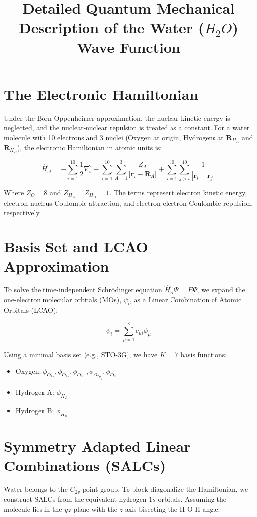 \documentclass[12pt]{article}
\title{Detailed Quantum Mechanical Description of the Water ($H_2O$) Wave Function}
\author{}
\date{}
\begin{document}
\maketitle

\section{The Electronic Hamiltonian}
Under the Born-Oppenheimer approximation, the nuclear kinetic energy is neglected, and the nuclear-nuclear repulsion is treated as a constant. For a water molecule with 10 electrons and 3 nuclei (Oxygen at origin, Hydrogens at $\mathbf{R}_{H_A}$ and $\mathbf{R}_{H_B}$), the electronic Hamiltonian in atomic units is:

\begin{equation}
\hat{H}_{el} = -\sum_{i=1}^{10} \frac{1}{2} \nabla_i^2 - \sum_{i=1}^{10} \sum_{A=1}^{3} \frac{Z_A}{|\mathbf{r}_i - \mathbf{R}_A|} + \sum_{i=1}^{10} \sum_{j>i}^{10} \frac{1}{|\mathbf{r}_i - \mathbf{r}_j|}
\end{equation}

Where $Z_O = 8$ and $Z_{H_A} = Z_{H_B} = 1$. The terms represent electron kinetic energy, electron-nucleus Coulombic attraction, and electron-electron Coulombic repulsion, respectively.

\section{Basis Set and LCAO Approximation}
To solve the time-independent Schr\"{o}dinger equation $\hat{H}_{el} \Psi = E \Psi$, we expand the one-electron molecular orbitals (MOs), $\psi_i$, as a Linear Combination of Atomic Orbitals (LCAO):

\begin{equation}
\psi_i = \sum_{\mu=1}^K c_{\mu i} \phi_\mu
\end{equation}

Using a minimal basis set (e.g., STO-3G), we have $K=7$ basis functions:
\begin{itemize}
    \item Oxygen: $\phi_{O_{1s}}, \phi_{O_{2s}}, \phi_{O_{2p_x}}, \phi_{O_{2p_y}}, \phi_{O_{2p_z}}$
    \item Hydrogen A: $\phi_{H_A}$
    \item Hydrogen B: $\phi_{H_B}$
\end{itemize}

\section{Symmetry Adapted Linear Combinations (SALCs)}
Water belongs to the $C_{2v}$ point group. To block-diagonalize the Hamiltonian, we construct SALCs from the equivalent hydrogen $1s$ orbitals.
Assuming the molecule lies in the $yz$-plane with the $z$-axis bisecting the H-O-H angle:
\end{document}
